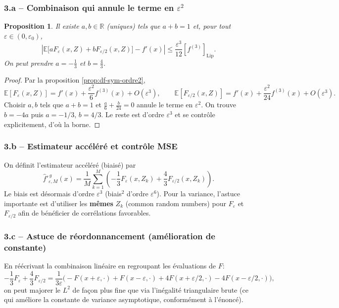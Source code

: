 \documentclass[11pt,a4paper]{article}
\newcommand{\E}{\mathbb{E}}
\newcommand{\R}{\mathbb{R}}
\newcommand{\1}{\mathbbm{1}}
\newcommand{\Lip}{\mathrm{Lip}}
\theoremstyle{plain}
\newtheorem{proposition}{Proposition}
\theoremstyle{definition}
\begin{document}
\subsubsection{3.a -- Combinaison qui annule le terme en $\varepsilon^2$}
\begin{proposition}\label{prop:richardson-2011}
Il existe $a,b\in\R$ (uniques) tels que $a+b=1$ et, pour tout $\varepsilon\in(0,\varepsilon_0)$,
\[
\left|\E\big[aF_\varepsilon(x,Z)+bF_{\varepsilon/2}(x,Z)\big]-f'(x)\right|
\le \frac{\varepsilon^3}{12}[f^{(3)}]_{\Lip}.
\]
On peut prendre $a=-\frac13$ et $b=\frac43$.
\end{proposition}
\begin{proof}
Par la proposition \ref{prop:df-sym-ordre2},
\[
\E[F_\varepsilon(x,Z)]=f'(x)+\frac{\varepsilon^2}{6}f^{(3)}(x)+O(\varepsilon^3),
\qquad
\E[F_{\varepsilon/2}(x,Z)]=f'(x)+\frac{\varepsilon^2}{24}f^{(3)}(x)+O(\varepsilon^3).
\]
Choisir $a,b$ tels que $a+b=1$ et $\frac{a}{6}+\frac{b}{24}=0$ annule le terme en $\varepsilon^2$.
On trouve $b=-4a$ puis $a=-1/3$, $b=4/3$.
Le reste est d'ordre $\varepsilon^3$ et se contrôle explicitement, d'où la borne.
\end{proof}

\subsubsection{3.b -- Estimateur accéléré et contrôle MSE}
On définit l'estimateur accéléré (biaisé) par
\[
\widehat f'^{\,g}_{\varepsilon,M}(x)
=\frac1M\sum_{k=1}^M\left(-\frac13F_\varepsilon(x,Z_k)+\frac43F_{\varepsilon/2}(x,Z_k)\right).
\]
Le biais est désormais d'ordre $\varepsilon^3$ (biais$^2$ d'ordre $\varepsilon^6$).
Pour la variance, l'astuce importante est d'utiliser les \textbf{mêmes} $Z_k$ (common random numbers) pour $F_\varepsilon$ et $F_{\varepsilon/2}$ afin de bénéficier de corrélations favorables.

\subsubsection{3.c -- Astuce de réordonnancement (amélioration de constante)}
En réécrivant la combinaison linéaire en regroupant les évaluations de $F$:
\[
-\frac13F_\varepsilon+\frac43F_{\varepsilon/2}
=\frac{1}{3\varepsilon}\Big(-F(x+\varepsilon,\cdot)+F(x-\varepsilon,\cdot)+4F(x+\varepsilon/2,\cdot)-4F(x-\varepsilon/2,\cdot)\Big),
\]
on peut majorer le $L^2$ de façon plus fine que via l'inégalité triangulaire brute (ce qui améliore la constante de variance asymptotique, conformément à l'énoncé).
\end{document}
